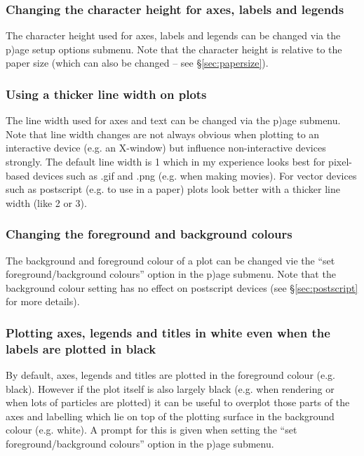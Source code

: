 \documentclass[a4paper,10pt]{article}
\begin{document}
\subsubsection{ Changing the character height for axes, labels and legends}
 The character height used for axes, labels and legends can be changed via the p)age setup options submenu. Note that the character height is relative to the paper size (which can also be changed -- see \S\ref{sec:papersize}).

\subsubsection{ Using a thicker line width on plots}
 The line width used for axes and text can be changed via the p)age submenu. Note that line width changes are not always obvious when plotting to an interactive device (e.g. an X-window) but influence non-interactive devices strongly. The default line width is 1 which in my experience looks best for pixel-based devices such as .gif and .png (e.g. when making movies). For vector devices such as postscript (e.g. to use in a paper) plots look better with a thicker line width (like 2 or 3). 

\subsubsection{ Changing the foreground and background colours}
\label{sec:pagecolours}
 The background and foreground colour of a plot can be changed vie the ``set foreground/background colours'' option in the p)age submenu. Note that the background colour setting has no effect on postscript devices (see \S\ref{sec:postscript} for more details).

\subsubsection{ Plotting axes, legends and titles in white even when the labels are plotted in black}
 By default, axes, legends and titles are plotted in the foreground colour (e.g. black). However if the plot itself is also largely black (e.g. when rendering or when lots of particles are plotted) it can be useful to overplot those parts of the axes and labelling which lie on top of the plotting surface in the background colour (e.g. white). A prompt for this is given when setting the ``set foreground/background colours'' option in the p)age submenu. 
 
\end{document}
